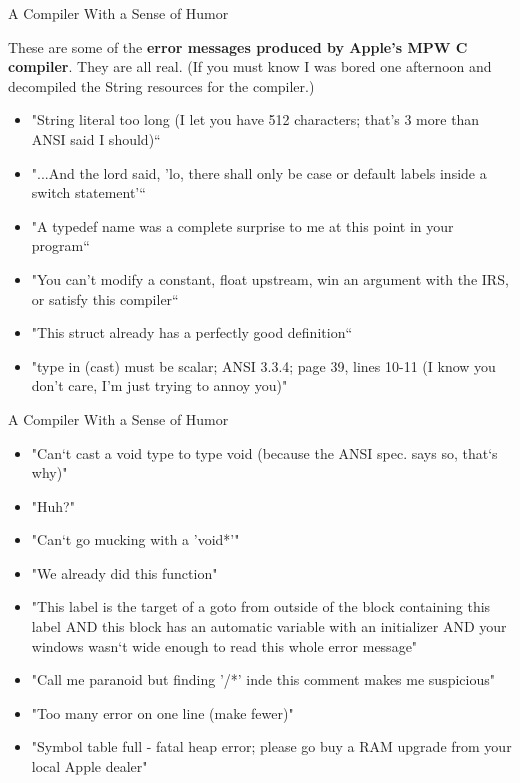 \documentclass[pdf]{beamer}
\begin{document}
\begin{frame}{A Compiler With a Sense of Humor}

These are some of the \textbf{error messages produced by Apple's MPW C compiler}. They are all real. (If you must know I was bored one afternoon and decompiled the String resources for the compiler.)

\begin{itemize}
\item
"String literal too long (I let you have 512 characters; that's 3 more than ANSI said I should)“
\item
"...And the lord said, 'lo, there shall only be case or default labels inside a switch statement'“
\item
"A typedef name was a complete surprise to me at this point in your program“
\item
"You can't modify a constant, float upstream, win an argument with the IRS, or satisfy this compiler“
\item
"This struct already has a perfectly good definition“
\item
"type in (cast) must be scalar; ANSI 3.3.4; page 39, lines 10-11 (I know you don't care, I'm just trying to annoy you)"
\end{itemize}
\end{frame}



\begin{frame}{A Compiler With a Sense of Humor}
\begin{itemize}
\item
"Can`t cast a void type to type void (because the ANSI spec. says so, that`s why)"
\item
"Huh?"
\item
"Can`t go mucking with a 'void*'"
\item
"We already did this function"
\item
"This label is the target of a goto from outside of the block containing this label AND this block has an automatic variable with an initializer AND your windows wasn`t wide enough to read this whole error message"
\item
"Call me paranoid but finding '/*' inde this comment makes me suspicious"
\item
"Too many error on one line (make fewer)"
\item
"Symbol table full - fatal heap error; please go buy a RAM upgrade from your local Apple dealer"
\end{itemize}
\end{frame}
\end{document}
